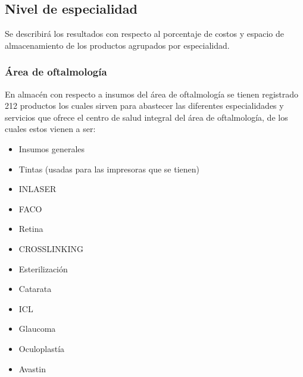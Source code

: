 \subsection{Nivel de especialidad}

Se describirá los resultados con respecto al porcentaje de costos y espacio de almacenamiento de los productos agrupados por especialidad.

\subsubsection{Área de oftalmología}

En almacén con respecto a insumos del área de oftalmología se tienen registrado 212 productos los cuales sirven para abastecer las diferentes especialidades y servicios que ofrece el centro de salud integral del área de oftalmología, de los cuales estos vienen a ser:

\begin{itemize}
    \item Insumos generales
    \item Tintas (usadas para las impresoras que se tienen)
    \item INLASER
    \item FACO
    \item Retina
    \item CROSSLINKING
    \item Esterilización
    \item Catarata
    \item ICL
    \item Glaucoma
    \item Oculoplastía
    \item Avastin 
\end{itemize}

\newpage

